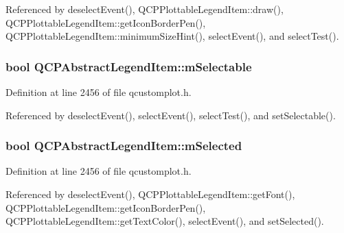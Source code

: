 Referenced by deselect\+Event(), Q\+C\+P\+Plottable\+Legend\+Item\+::draw(), Q\+C\+P\+Plottable\+Legend\+Item\+::get\+Icon\+Border\+Pen(), Q\+C\+P\+Plottable\+Legend\+Item\+::minimum\+Size\+Hint(), select\+Event(), and select\+Test().

\hypertarget{class_q_c_p_abstract_legend_item_aa84029f57b1b32f642fb7db63c3fc2c2}{}
\subsubsection[{m\+Selectable}]{\setlength{\rightskip}{0pt plus 5cm}bool Q\+C\+P\+Abstract\+Legend\+Item\+::m\+Selectable\hspace{0.3cm}{\ttfamily [protected]}}\label{class_q_c_p_abstract_legend_item_aa84029f57b1b32f642fb7db63c3fc2c2}


Definition at line 2456 of file qcustomplot.\+h.



Referenced by deselect\+Event(), select\+Event(), select\+Test(), and set\+Selectable().

\hypertarget{class_q_c_p_abstract_legend_item_ae58ebebbd0c36cc6fe897483369984d2}{}
\subsubsection[{m\+Selected}]{\setlength{\rightskip}{0pt plus 5cm}bool Q\+C\+P\+Abstract\+Legend\+Item\+::m\+Selected\hspace{0.3cm}{\ttfamily [protected]}}\label{class_q_c_p_abstract_legend_item_ae58ebebbd0c36cc6fe897483369984d2}


Definition at line 2456 of file qcustomplot.\+h.



Referenced by deselect\+Event(), Q\+C\+P\+Plottable\+Legend\+Item\+::get\+Font(), Q\+C\+P\+Plottable\+Legend\+Item\+::get\+Icon\+Border\+Pen(), Q\+C\+P\+Plottable\+Legend\+Item\+::get\+Text\+Color(), select\+Event(), and set\+Selected().

\hypertarget{class_q_c_p_abstract_legend_item_ab971df604306b192875a7d097feb1e21}{}
